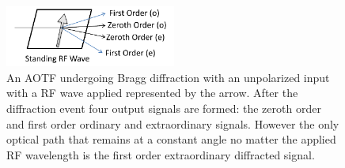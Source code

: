 \documentclass[12pt]{article}
\begin{document}
\clearpage

\begin{figure}
    \begin{center}
    \includegraphics[width=0.5\textwidth]{./Images/3-1-AOTFGeneralLayout.pdf}
    \caption{An AOTF undergoing Bragg diffraction with an unpolarized input with a RF wave applied represented by the arrow. After the diffraction event four output signals are formed: the zeroth order and first order ordinary and extraordinary signals. However the only optical path that remains at a constant angle no matter the applied RF wavelength is the first order extraordinary diffracted signal.}
    \label{fig:3.1:ATOFLayout}
    \end{center}
\end{figure}

\clearpage
\end{document}
